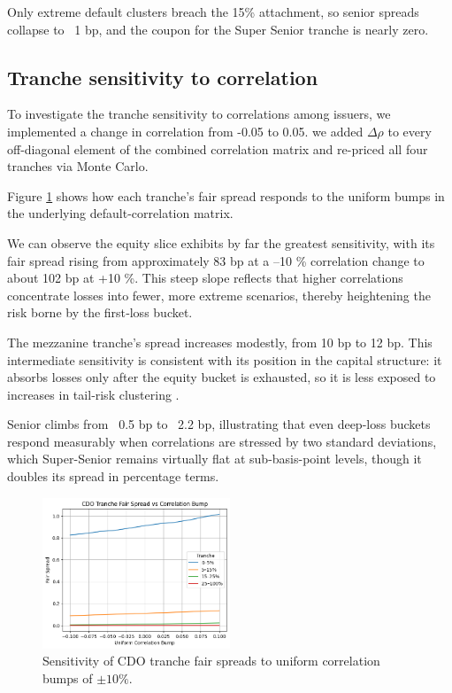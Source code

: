 \documentclass[
	a4paper,         %
	12pt,            %
	unnumberedsections,  %
	twoside,         %
]{LTJournalArticle}
\begin{document}
Only extreme default clusters breach the 15\% attachment, so senior spreads collapse to ~1 bp, and the coupon for the Super Senior tranche is nearly zero.

\subsection{Tranche sensitivity to correlation}
To investigate the tranche sensitivity to correlations among issuers, we implemented a change in correlation from -0.05 to 0.05. we added $\Delta\rho$ to every off-diagonal element of the combined correlation matrix and re-priced all four tranches via Monte Carlo.

Figure \ref{fig:corr_bump} shows how each tranche's fair spread responds to the uniform bumps in the underlying default-correlation matrix.

We can observe the equity slice exhibits by far the greatest sensitivity, with its fair spread rising from approximately 83 bp at a –10 \% correlation change to about 102 bp at +10 \%.  This steep slope reflects that higher correlations concentrate losses into fewer, more extreme scenarios, thereby heightening the risk borne by the first‐loss bucket.

The mezzanine tranche’s spread increases modestly, from 10 bp to 12 bp. This intermediate sensitivity is consistent with its position in the capital structure: it absorbs losses only after the equity bucket is exhausted, so it is less exposed to increases in tail‐risk clustering .

Senior climbs from ~0.5 bp to ~2.2 bp, illustrating that even deep-loss buckets respond measurably when correlations are stressed by two standard deviations, which Super-Senior remains virtually flat at sub-basis-point levels, though it doubles its spread in percentage terms.


\begin{figure}[ht]
  \centering
  \includegraphics[width=0.5\textwidth]{Figures/output.png}
  \caption{Sensitivity of CDO tranche fair spreads to uniform correlation bumps of $\pm10\%$.}
  \label{fig:corr_bump}

\end{figure}
\end{document}
